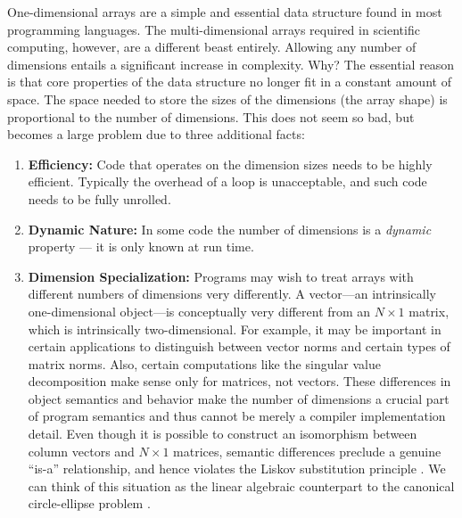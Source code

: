 \documentclass[preprint]{sigplanconf}
\begin{document}
One-dimensional arrays are a simple and essential data structure found in most
programming languages. The multi-dimensional arrays required in scientific
computing, however, are a different beast entirely. Allowing any number of
dimensions entails a significant increase in complexity. Why? The essential
reason is that core properties of the data structure no longer fit in a
constant amount of space. The space needed to store the sizes of the
dimensions (the array shape) is proportional to the number of dimensions. This
does not seem so bad, but becomes a large problem due to three additional
facts:

\begin{enumerate}

\item{\bf Efficiency:} Code that operates on the dimension sizes needs to be
highly efficient. Typically the overhead of a loop is unacceptable, and such
code needs to be fully unrolled.

\item{\bf Dynamic Nature:} In some code the number of dimensions is a
\emph{dynamic} property --- it is only known at run time.


\item {\bf Dimension Specialization:} Programs may wish to treat arrays with
different numbers of dimensions very differently. A vector---an intrinsically
one-dimensional object---is conceptually very different from an $N\times1$
matrix, which is intrinsically two-dimensional. For example, it may be important
in certain applications to distinguish between vector norms and certain types
of matrix norms. Also, certain computations like the singular value decomposition
make sense only for matrices, not vectors. These differences in object semantics
and behavior make the number of dimensions a crucial part of program semantics and
thus cannot be merely a compiler implementation detail. Even though it is possible
to construct an isomorphism between column vectors and $N\times1$ matrices,
semantic differences preclude a genuine ``is-a'' relationship, and hence violates
the Liskov substitution principle \cite{Liskov:1987da}. We can think of this
situation as the linear algebraic counterpart to the canonical circle-ellipse
problem \cite{Halbert:1987ut}.


\end{enumerate}
\end{document}
